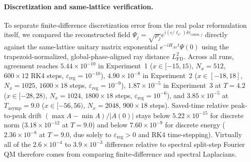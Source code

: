 \documentclass[11pt, a4paper]{article}
\theoremstyle{definition}
\begin{document}
\paragraph{Discretization and same-lattice verification.}
To separate finite-difference discretization error from the real polar reformulation itself, we compared the reconstructed field $\Psi_j = \sqrt{\rho_j}e^{i(c/\ell_C)\delta\tau_{\text{canon}, j}}$ directly against the same-lattice unitary matrix exponential $e^{-i H_{\Delta x} t}\Psi(0)$ using the trapezoid-normalized, global-phase-aligned ray distance $L^2_{\text{FD}}$. Across all runs, agreement reaches $5.44 \times 10^{-10}$ in Experiment~1 ($x \in [-15, 15)$, $N_x = 512$, $600 \times 12$ RK4 steps, $\varepsilon_{\text{reg}} = 10^{-10}$), $4.90 \times 10^{-8}$ in Experiment~2 ($x \in [-18, 18]$, $N_x = 1025$, $1600 \times 18$ steps, $\varepsilon_{\text{reg}} = 10^{-9}$), $1.87 \times 10^{-5}$ in Experiment~3 at $T = 4.2$ ($x \in [-28, 28)$, $N_x = 1024$, $1800 \times 18$ steps, $\varepsilon_{\text{reg}} = 10^{-6}$), and $3.85 \times 10^{-5}$ at $T_{\text{asymp}} = 9.0$ ($x \in [-56, 56)$, $N_x = 2048$, $900 \times 18$ steps). Saved-time relative peak-to-peak drift $(\max A - \min A)/|A(0)|$ stays below $5.22 \times 10^{-15}$ for discrete norm ($3.18 \times 10^{-12}$ at $T = 9.0$) and below $7.60 \times 10^{-9}$ for discrete energy ($2.36 \times 10^{-8}$ at $T = 9.0$, due solely to $\varepsilon_{\text{reg}} > 0$ and RK4 time-stepping). Virtually all of the $2.6 \times 10^{-4}$ to $3.9 \times 10^{-3}$ difference relative to spectral split-step Fourier QM therefore comes from comparing finite-difference and spectral Laplacians.
\end{document}
